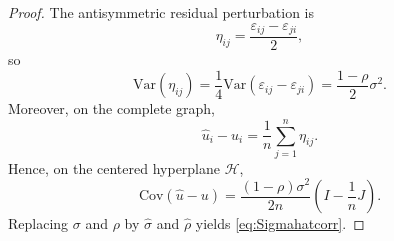 \documentclass[10pt,a4paper]{amsart}
\begin{document}
\begin{proof}
The antisymmetric residual perturbation is
\[
\eta_{ij}=\frac{\varepsilon_{ij}-\varepsilon_{ji}}{2},
\]
so
\[
\mathrm{Var}(\eta_{ij})
=
\frac14\mathrm{Var}(\varepsilon_{ij}-\varepsilon_{ji})
=
\frac{1-\rho}{2}\sigma^2.
\]
Moreover, on the complete graph,
\[
\widehat u_i-u_i=\frac1n\sum_{j=1}^n \eta_{ij}.
\]
Hence, on the centered hyperplane $\mathcal H$,
\[
\mathrm{Cov}(\widehat u-u)
=
\frac{(1-\rho)\sigma^2}{2n}
\left(I-\frac1nJ\right).
\]
Replacing $\sigma$ and $\rho$ by $\widehat\sigma$ and $\widehat\rho$ yields \eqref{eq:Sigmahatcorr}.
\end{proof}
\end{document}

